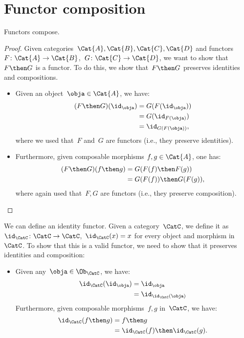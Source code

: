 \section{Functor composition}
\begin{lemma}
Functors compose.
\end{lemma}
\begin{proof}
Given categories~$\Cat{A},\Cat{B},\Cat{C},\Cat{D}$ and functors~$F\colon \Cat{A}\to \Cat{B}$,~$G\colon \Cat{C}\to \Cat{D}$, we want to show that~$F\then G$ is a functor. To do this, we show that~$F\then G$ preserves identities and compositions. 
\begin{itemize}
    \item Given an object~$\obja\in \Cat{A}$, we have:
    \begin{equation*}
        \begin{aligned}
            (F\then G)(\id_\obja)&=G(F(\id_\obja))\\
            &=G(\id_{F(\obja)})\\
            &=\id_{G(F(\obja))},
        \end{aligned}
    \end{equation*}
    where we used that~$F$ and~$G$ are functors (i.e., they preserve identities).
    \item Furthermore, given composable morphisms $f,g\in \Cat{A}$, one has:
    \begin{equation*}
        \begin{aligned}
            (F\then G)(f\then g)&=G(F(f)\then F(g))\\
            &=G(F(f))\then G(F(g)),
        \end{aligned}
    \end{equation*}
    where again used that~$F,G$ are functors (i.e., they preserve composition).
\end{itemize}
\end{proof}

We can define an identity functor. Given a category~$\CatC$, we define it as~$\id_\CatC\colon \CatC \to \CatC$,~$\id_\CatC(x)=x$ for every object and morphism in~$\CatC$. To show that this is a valid functor, we need to show that it preserves identities and composition:
\begin{itemize}
    \item Given any~$\obja \in \Ob_\CatC$, we have:
    \begin{equation*}
        \begin{aligned}
            \id_\CatC(\id_\obja)&=\id_\obja\\
            &=\id_{\id_\CatC(\obja)}
        \end{aligned}
    \end{equation*}
    Furthermore, given composable morphisms~$f,g$ in~$\CatC$, we have:
    \begin{equation*}
    \begin{aligned}
        \id_{\CatC}(f\then g)&=f\then g\\
        &=\id_{\CatC}(f)\then \id_{\CatC} (g).
    \end{aligned}
    \end{equation*}
\end{itemize}


